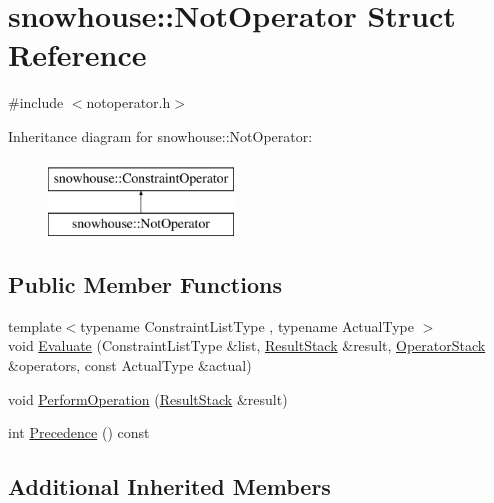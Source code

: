 \hypertarget{structsnowhouse_1_1NotOperator}{}\section{snowhouse\+::Not\+Operator Struct Reference}
\label{structsnowhouse_1_1NotOperator}


{\ttfamily \#include $<$notoperator.\+h$>$}

Inheritance diagram for snowhouse\+::Not\+Operator\+:\begin{figure}[H]
\begin{center}
\leavevmode
\includegraphics[height=2.000000cm]{structsnowhouse_1_1NotOperator}
\end{center}
\end{figure}
\subsection*{Public Member Functions}
\begin{DoxyCompactItemize}
\item 
{\footnotesize template$<$typename Constraint\+List\+Type , typename Actual\+Type $>$ }\\void \mbox{\hyperlink{structsnowhouse_1_1NotOperator_aeeea8b6884150f3c023266eeb3390de1}{Evaluate}} (Constraint\+List\+Type \&list, \mbox{\hyperlink{namespacesnowhouse_a719169b1315a13161c15f25e600a8f51}{Result\+Stack}} \&result, \mbox{\hyperlink{namespacesnowhouse_adcb10e215e6a4bbcb35722a9c7270fc6}{Operator\+Stack}} \&operators, const Actual\+Type \&actual)
\item 
void \mbox{\hyperlink{structsnowhouse_1_1NotOperator_af2dc2b844260fd317207960087bd074f}{Perform\+Operation}} (\mbox{\hyperlink{namespacesnowhouse_a719169b1315a13161c15f25e600a8f51}{Result\+Stack}} \&result)
\item 
int \mbox{\hyperlink{structsnowhouse_1_1NotOperator_aa8efde1ec3fd4ff2fee91a6985b6c36c}{Precedence}} () const
\end{DoxyCompactItemize}
\subsection*{Additional Inherited Members}


